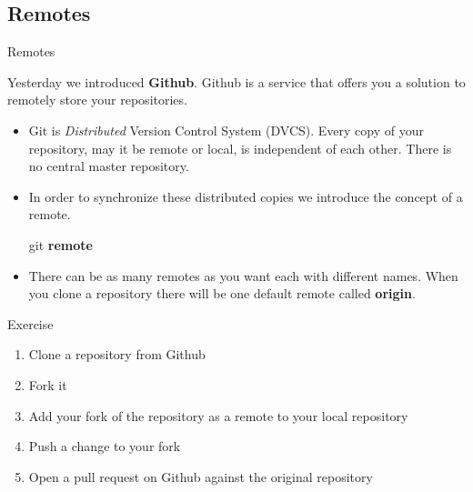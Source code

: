\documentclass{beamer}
\begin{document}
\subsection{Remotes}
\begin{frame}[fragile]{Remotes}

Yesterday we introduced \textbf{Github}. Github is a service that offers you a solution to remotely store your repositories. 
\begin{itemize}
    \item Git is \emph{Distributed} Version Control System (DVCS). Every copy of your repository, may it be remote or local, is independent of each other. There is no central master repository. 

    \item In order to synchronize these distributed copies we introduce the concept of a remote.
\pause
  \begin{block}{}
    git \textbf{remote}
  \end{block}
\pause
  \item There can be as many remotes as you want each with different names. When you clone a repository there will be one default remote called \textbf{origin}.
\end{itemize}
\end{frame}
\begin{frame}
  \begin{block}{Exercise}
    \begin{enumerate}
      \item Clone a repository from Github
      \item Fork it
      \item Add your fork of the repository as a remote to your local repository
      \item Push a change to your fork
      \item Open a pull request on Github against the original repository
    \end{enumerate}
  \end{block}
\end{frame}
\end{document}
